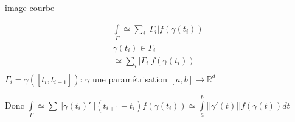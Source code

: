 \documentclass[11pt]{article}
\begin{document}
image courbe

\begin{align*}
\int\limits_{\Gamma} \simeq \sum\limits_i |\Gamma_i| f(\gamma(t_i))\\
\gamma(t_i) \in \Gamma_i \\
\simeq \sum\limits_i |\Gamma_i| f(\gamma(t_i))\\
\end{align*}
\(\Gamma_i = \gamma \left( \left[ t_i, t_{i+1} \right] \right)\): \(\gamma\) une paramétrisation \(\left[a,b\right] \rightarrow \mathbb{R}^d\)

Donc \(\int\limits_{\Gamma} \simeq \sum\limits ||\gamma(t_i)'|| (t_{i+1} - t_i) f(\gamma(t_i)) \simeq \int\limits_{a}^{b} ||\gamma'(t)|| f(\gamma(t)) dt\)
\end{document}
